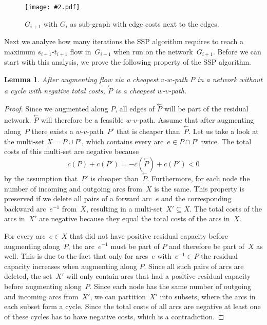 \documentclass[11pt]{article}
\newtheorem{lemma}[theorem]{Lemma}
\newcommand{\GFX}[2][]{\texttt{[image: \#2.pdf]}}
\newenvironment{fig}
{\begin{figure}[th]\begin{center}}
{\end{center}\end{figure}}
\begin{document}
\begin{fig}
  \GFX[width=0.5\textwidth]{Iteration1}
 \caption[]
   {$G_{i+1}$ with $G_i$ as sub-graph with edge costs next to the edges.}
  \label{fig:step II}
\end{fig}

Next we analyze how many iterations the SSP algorithm requires to reach a maximum $s_{i+1}$-$t_{i+1}$ flow in~$G_{i+1}$ when run on the network~$G_{i+1}$.
Before we can start with this analysis, we prove the following property of the SSP algorithm.
\begin{lemma}
\label{lemma: shortest backward path} 
After augmenting flow via a cheapest $v$-$w$-path $P$ in a network without a cycle with negative total costs, $\stackrel{\leftarrow}{P}$ is a cheapest $w$-$v$-path. 
\end{lemma}
\begin{proof}
Since we augmented along $P$, all edges of $\stackrel{\leftarrow}{P}$ will be part of the residual network. $\stackrel{\leftarrow}{P}$ will therefore be a feasible $w$-$v$-path.
Assume that after augmenting along~$P$ there exists a $w$-$v$-path~$P'$
that is cheaper than~$\stackrel{\leftarrow}{P}$.
Let us take a look at the multi-set $X=P\cup P'$, which contains every arc~$e\in P\cap P'$ twice.
The total costs of this multi-set are negative because
\[
  c(P) + c(P') = -c(\stackrel{\leftarrow}{P}) + c(P') < 0
\] 
by the assumption that~$P'$ is cheaper than~$\stackrel{\leftarrow}{P}$.
Furthermore, for each node the number of incoming and outgoing arcs from~$X$ is the same.
This property is preserved if we delete all pairs of a forward arc~$e$ and the corresponding 
backward arc~$e^{-1}$ from~$X$, resulting in a multi-set~$X'\subseteq X$.
The total costs of the arcs in~$X'$ are negative because they equal the total costs of the arcs in~$X$.  

For every arc~$e\in X$ that did not have positive residual capacity before augmenting along~$P$, the arc~$e^{-1}$ must be part of $P$ and therefore be part of~$X$ as well.
This is due to the fact that only for arcs~$e$ with~$e^{-1} \in P$ the residual capacity increases when augmenting along $P$.
Since all such pairs of arcs are deleted, the set~$X'$ will only contain arcs that had a positive residual capacity
before augmenting along~$P$. Since each node has the same number of outgoing and
incoming arcs from~$X'$, we can partition~$X'$ into subsets, where the arcs in each subset
form a cycle. Since the total costs of all arcs are negative at
least one of these cycles has to have negative costs, which is a contradiction.
\end{proof}
\end{document}

